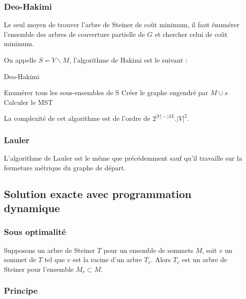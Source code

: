 \documentclass[a4paper,11pt]{thesis}
\begin{document}

\subsubsection{Deo-Hakimi}

Le seul moyen de trouver l'arbre de Steiner de coût minimum, il faut énumérer l'ensemble des
arbres de couverture partielle de $G$ et chercher celui de coût minimum.

On appelle $S = V \backslash M$, l'algorithme de Hakimi est le suivant :
\begin{algorithm}
    \caption{Deo-Hakimi}
    \label{deohakimi}
    \begin{algorithmic}[1]
        \State Enumérer tous les sous-ensembles de S
            \State Créer le graphe engendré par $M \cup s$
            \State Calculer le MST
        \EndFor
    \end{algorithmic}
\end{algorithm}

La complexité de cet algorithme est de l'ordre de $2^{|V| - |M|}. |V|^2$.

\subsubsection{Lauler}

L'algorithme de Lauler est le même que précédemment sauf qu'il travaille sur la fermeture métrique
du graphe de départ.

\subsection{Solution exacte avec programmation dynamique}

\subsubsection{Sous optimalit\'{e}}

Supposons un arbre de Steiner $T$ pour un ensemble de sommets $M$, soit $v$ un sommet de $T$ tel que
$v$ est la racine d'un arbre $T_v$. Alors $T_v$ est un arbre de Steiner pour l'ensemble $M_v \subset
M$.


\subsubsection{Principe}
\end{document}
